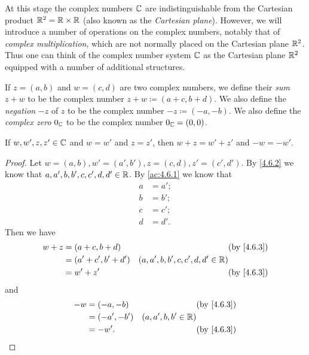 \begin{note}
  At this stage the complex numbers \(\mathbb{C}\) are indistinguishable from the Cartesian product \(\mathbb{R}^2 = \mathbb{R} \times \mathbb{R}\)
  (also known as the \emph{Cartesian plane}).
  However, we will introduce a number of operations on the complex numbers, notably that of \emph{complex multiplication}, which are not normally placed on the Cartesian plane \(\mathbb{R}^2\).
  Thus one can think of the complex number system \(\mathbb{C}\) as the Cartesian plane \(\mathbb{R}^2\) equipped with a number of additional structures.
\end{note}

\begin{defn}\label{4.6.3}
  If \(z = (a, b)\) and \(w = (c, d)\) are two complex numbers, we define their \emph{sum} \(z + w\) to be the complex number \(z + w \coloneqq (a + c, b + d)\).
  We also define the \emph{negation} \(-z\) of \(z\) to be the complex number \(-z \coloneqq (-a, -b)\).
  We also define the \emph{complex zero} \(0_{\mathbb{C}}\) to be the complex number \(0_{\mathbb{C}} = (0, 0)\).
\end{defn}

\begin{ac}\label{ac:4.6.2}
  If \(w, w', z, z' \in \mathbb{C}\) and \(w = w'\) and \(z = z'\), then \(w + z = w' + z'\) and \(-w = -w'\).
\end{ac}

\begin{proof}
  Let \(w = (a, b), w' = (a', b'), z = (c, d), z' = (c', d')\).
  By \cref{4.6.2} we know that \(a, a', b, b', c, c', d, d' \in \mathbb{R}\).
  By \cref{ac:4.6.1} we know that
  \begin{align*}
    a & = a'; \\
    b & = b'; \\
    c & = c'; \\
    d & = d'.
  \end{align*}
  Then we have
  \begin{align*}
    w + z & = (a + c, b + d)     &                                     & \text{(by \cref{4.6.3})} \\
          & = (a' + c', b' + d') & (a, a', b, b', c, c', d, d' \in \R)                            \\
          & = w' + z'            &                                     & \text{(by \cref{4.6.3})}
  \end{align*}
  and
  \begin{align*}
    -w & = (-a, -b)   &                       & \text{(by \cref{4.6.3})} \\
       & = (-a', -b') & (a, a', b, b' \in \R)                            \\
       & = -w'.       &                       & \text{(by \cref{4.6.3})}
  \end{align*}
\end{proof}


